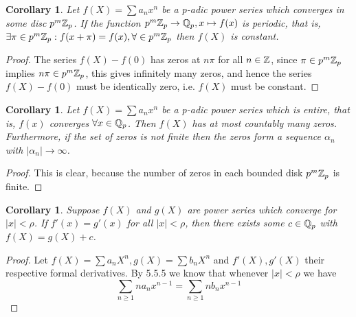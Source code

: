 \documentclass[a4paper]{article}
\theoremstyle{plain}
\newtheorem{Cor}[thm]{Corollary}
\theoremstyle{definition}
\begin{document}
\begin{Cor}
  Let $f(X) = \sum a_{n}x^{n}$ be a p-adic power series which converges in some disc $p^{m}\Bbb Z_{p}$. If the function $p^{m}\Bbb Z_{p} \to \Bbb Q_{p}, x \mapsto f(x)$ is periodic, that is, $\exists \pi \in p^{m}\Bbb Z_{p} : f(x + \pi) = f(x), \forall \in p^{m}\Bbb Z_{p}$ then $f(X)$ is constant.
\end{Cor}
\begin{proof}
The series $f(X) - f(0)$ has zeros at $n\pi$ for all $n \in \Bbb Z$, since $\pi \in p^{m}\Bbb Z_{p}$ implies $n\pi \in p^{m}\Bbb Z_{p}$, this gives infinitely many zeros, and hence the series $f(X) - f(0)$ must be identically zero, i.e. $f(X)$ must be constant.
\end{proof}
\begin{Cor}
  Let $f(X) = \sum a_{n}x^{n}$ be a p-adic power series which is entire, that is, $f(x)$ converges $\forall x \in \Bbb Q_{p}$. Then $f(X)$ has at most countably many zeros. Furthermore, if the set of zeros is not finite then the zeros form a sequence $\alpha_{n}$ with $|\alpha_{n}| \to \infty$.
\end{Cor}
\begin{proof}
  This is clear, because the number of zeros in each bounded disk $p^{m}\Bbb Z_{p}$ is finite.
\end{proof}
\begin{Cor} Suppose $f(X)$ and $g(X)$ are power series which converge for $|x| < \rho$. If $f'(x)=g'(x)$ for all $|x| < \rho$, then there exists some $c \in \Bbb Q_{p}$ with $f(X)=g(X)+c$.
\end{Cor}
\begin{proof}
  Let $f(X) = \sum a_{n}X^{n}, g(X) = \sum b_{n}X^{n}$ and $f'(X), g'(X)$ their respective formal derivatives. By 5.5.5 we know that whenever $|x| < \rho$ we have
  $$\sum_{n \geq 1}na_{n}x^{n-1} = \sum_{n \geq 1}nb_{n}x^{n-1}$$
\end{proof}
\end{document}
